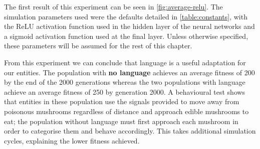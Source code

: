 \documentclass[12pt,a4paper]{report}
\begin{document}
The first result of this experiment can be seen in \cref{fig:average-relu}. The simulation parameters used were the defaults detailed in \cref{table:constants}, with the ReLU activation function used in the hidden layer of the neural networks and a sigmoid activation function used at the final layer. Unless otherwise specified, these parameters will be assumed for the rest of this chapter.

From this experiment we can conclude that language is a useful adaptation for our entities. The population with {\bf no language} achieves an average fitness of 200 by the end of the 2000 generations whereas the two populations with language achieve an average fitness of 250 by generation 2000. A behavioural test shows that entities in these population use the signals provided to move away from poisonous mushrooms regardless of distance and approach edible mushrooms to eat; the population without language must first approach each mushroom in order to categorise them and behave accordingly. This takes additional simulation cycles, explaining the lower fitness achieved.
\end{document}

